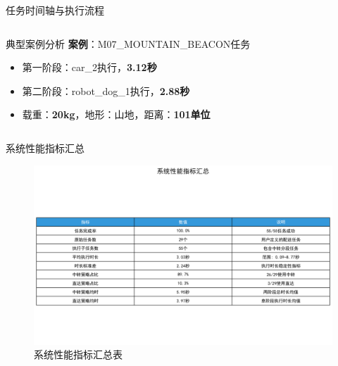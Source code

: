 \documentclass[
10pt,
aspectratio=169,
]{beamer}
\begin{document}
\begin{frame}{任务时间轴与执行流程}
\begin{columns}
\begin{column}{0.4\textwidth}
            \begin{alertblock}{典型案例分析}
                \textbf{案例}：M07\_MOUNTAIN\_BEACON任务
                \begin{itemize}
                    \item 第一阶段：car\_2执行，\textbf{3.12秒}
                    \item 第二阶段：robot\_dog\_1执行，\textbf{2.88秒}
                    \item 载重：\textbf{20kg}，地形：山地，距离：\textbf{101单位}
                \end{itemize}
            \end{alertblock}
        \end{column}
    \end{columns}
\end{frame}


\begin{frame}{系统性能指标汇总}
    \begin{figure}
        \centering
        \includegraphics[width=\textwidth]{analysis_results/system_performance_table_20250617_081500.png}
        \caption{系统性能指标汇总表}
    \end{figure}
\end{frame}
\end{document}
